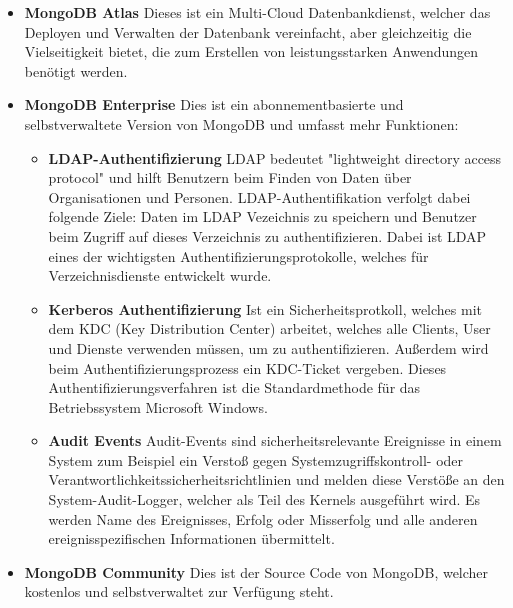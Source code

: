 \begin{itemize}
    \item \textbf{MongoDB Atlas}
        \newline
        Dieses ist ein Multi-Cloud Datenbankdienst, welcher das Deployen und Verwalten der Datenbank vereinfacht, aber gleichzeitig die Vielseitigkeit bietet, die zum Erstellen von leistungsstarken Anwendungen benötigt werden.
    \item \textbf{MongoDB Enterprise}
        \newline
        Dies ist ein abonnementbasierte und selbstverwaltete Version von MongoDB und umfasst mehr Funktionen:
        \begin{itemize}
            \item \textbf{LDAP-Authentifizierung}
                \newline
                LDAP bedeutet "lightweight directory access protocol" und hilft Benutzern beim Finden von Daten über Organisationen und Personen. LDAP-Authentifikation verfolgt dabei folgende Ziele: Daten im LDAP Vezeichnis zu speichern und Benutzer beim Zugriff auf dieses Verzeichnis zu authentifizieren. Dabei ist LDAP eines der wichtigsten Authentifizierungsprotokolle, welches für Verzeichnisdienste entwickelt wurde.
                \cite{ldap_auth}
            \item \textbf{Kerberos Authentifizierung}
                \newline
                Ist ein Sicherheitsprotkoll, welches mit dem KDC (Key Distribution Center) arbeitet, welches alle Clients, User und Dienste verwenden müssen, um zu authentifizieren. Außerdem wird beim Authentifizierungsprozess ein KDC-Ticket vergeben. Dieses Authentifizierungsverfahren ist die Standardmethode für das Betriebssystem Microsoft Windows.
                \cite{kerberos_auth}
            \item \textbf{Audit Events}
                \newline
                Audit-Events sind sicherheitsrelevante Ereignisse in einem System zum Beispiel ein Verstoß gegen Systemzugriffskontroll- oder Verantwortlichkeitssicherheitsrichtlinien und melden diese Verstöße an den System-Audit-Logger, welcher als Teil des Kernels ausgeführt wird. Es werden Name des Ereignisses, Erfolg oder Misserfolg und alle anderen ereignisspezifischen Informationen übermittelt.
                \cite{audit_events}
\end{itemize}
    \item \textbf{MongoDB Community}
        \newline
        Dies ist der Source Code von MongoDB, welcher kostenlos und selbstverwaltet zur Verfügung steht.
\end{itemize}
\cite{mongodb_basics}


